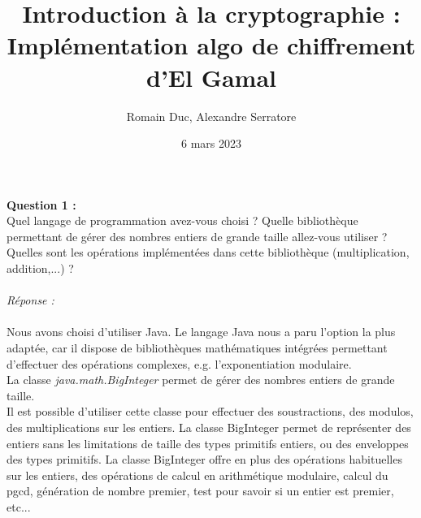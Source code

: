 \documentclass[a4paper,11pt]{article}
\title{Introduction à la cryptographie : Implémentation algo de chiffrement d'El Gamal}
\author{Romain Duc, Alexandre Serratore}
\date{6 mars 2023}
\begin{document}
	\maketitle
        \label{subsec:Q1}
        \textbf{Question 1 : \\}Quel langage de programmation avez-vous choisi ? Quelle bibliothèque permettant de gérer des nombres entiers de grande taille allez-vous utiliser ? Quelles sont les opérations implémentées dans cette bibliothèque (multiplication, addition,...) ?\\
		\textit{\\Réponse :} \\\\Nous avons choisi d'utiliser Java. Le langage Java nous a paru l'option la plus adaptée, car il dispose de bibliothèques mathématiques intégrées permettant d'effectuer des opérations complexes, e.g. l'exponentiation modulaire.\\La classe\textit{ java.math.BigInteger } permet de gérer des nombres entiers de grande taille. \\Il est possible d'utiliser cette classe pour effectuer des soustractions, des modulos, des multiplications sur les entiers. La classe BigInteger permet de représenter des entiers sans les limitations de taille des types primitifs entiers, ou des enveloppes des types primitifs. La classe BigInteger offre en plus des opérations habituelles sur les entiers, des opérations de calcul en arithmétique modulaire, calcul du pgcd, génération de nombre premier, test pour savoir si un entier est premier, etc...  \\\\
\end{document}
